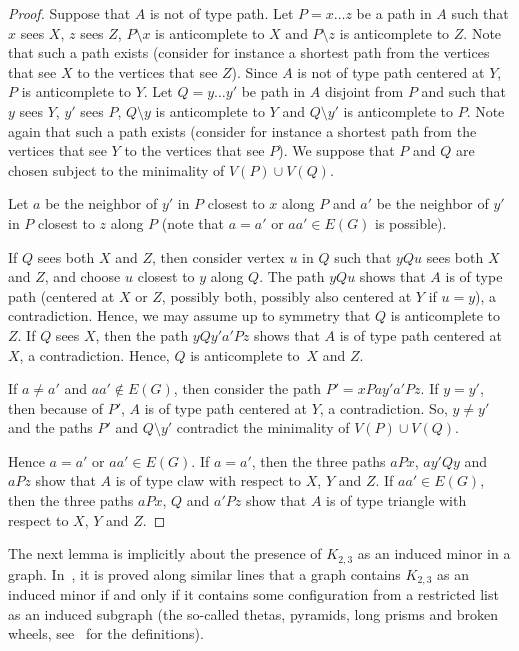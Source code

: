 \documentclass[11pt]{article}
\newcommand{\sm}{\setminus}
\theoremstyle{definition}
\theoremstyle{definition}
\begin{document}
\begin{proof}
  Suppose that $A$ is not of type path.  Let $P =x \dots z$ be a path
  in $A$ such that $x$ sees $X$, $z$ sees $Z$, $P\sm x$ is
  anticomplete to $X$ and $P\sm z$ is anticomplete to $Z$. Note that
  such a path exists (consider for instance a shortest path from the
  vertices that see $X$ to the vertices that see $Z$).  Since $A$ is not
  of type path centered at $Y$, $P$ is anticomplete to $Y$.  Let
  $Q = y\dots y'$ be path in $A$ disjoint from $P$ and such that $y$
  sees $Y$, $y'$ sees $P$, $Q \sm y$ is anticomplete to $Y$ and
  $Q\sm y'$ is anticomplete to $P$.  Note again that such a path
  exists (consider for instance a shortest path from the vertices that
  see $Y$ to the vertices that see $P$).  We suppose that $P$ and $Q$
  are chosen subject to the minimality of $V(P) \cup V(Q)$.

  Let $a$ be the neighbor of $y'$ in $P$ closest to $x$ along $P$ and
  $a'$ be the neighbor of $y'$ in $P$ closest to $z$ along $P$
  (note that $a=a'$ or  $aa'\in E(G)$ is possible).

   
  If $Q$ sees both $X$ and $Z$, then consider vertex $u$ in $Q$ such that $yQu$ sees both $X$ and $Z$, and choose $u$ closest to $y$ along $Q$. The path $yQu$ shows that $A$ is of type path (centered at $X$ or $Z$, possibly both, possibly also centered at $Y$ if $u=y$), a contradiction. Hence, we may assume up to symmetry that $Q$ is anticomplete to $Z$. 
  If $Q$ sees $X$, then the path $yQy'a'Pz$ shows that $A$ is of type
  path centered at $X$, a contradiction.  Hence, $Q$ is anticomplete
  to~$X$ and $Z$.

  If $a\neq a'$ and $aa'\notin E(G)$, then  consider the path $P' = x P a y' a' P z$.  If  $y=y'$, then because of $P'$, $A$ is of type path centered at $Y$, a  contradiction.  So, $y\neq y'$ and the paths $P'$ and $Q\sm y'$ contradict the minimality of $V(P) \cup V(Q)$.

  Hence $a=a'$ or $aa'\in E(G)$.  If $a=a'$, then the three paths
  $aPx$, $ay'Qy$ and $aPz$ show that $A$ is of type claw with respect
  to $X$, $Y$ and $Z$.  If $aa'\in E(G)$, then the three paths $aPx$,
  $Q$ and $a'Pz$ show that $A$ is of type triangle with respect to $X$,
  $Y$ and $Z$.
\end{proof}


The next lemma is implicitly about the presence of $K_{2, 3}$ as an
induced minor in a graph. In~\cite{DBLP:conf/iwoca/DallardDHMPT24},
it is proved along similar lines that a graph contains $K_{2, 3}$ as
an induced minor if and only if it contains some configuration from a
restricted list as an induced subgraph (the so-called thetas,
pyramids, long prisms and broken wheels,
see~\cite{DBLP:conf/iwoca/DallardDHMPT24} for the definitions).
\end{document}
